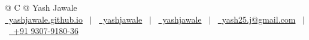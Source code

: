 \documentclass[a4paper,10pt]{article}
\begin{document}
\pagestyle{empty} 



\begin{tabularx}{\linewidth}{@{} C @{}}
\Huge{Yash Jawale} \\[14pt]
\normalsize
\href{https://yashjawale.github.io/}{\raisebox{-0.05\height}\faGlobe \ yashjawale.github.io} \ $|$ \ 
\href{https://github.com/yashjawale}{\raisebox{-0.05\height}\faGithub\ yashjawale} \ $|$ \ 
\href{https://linkedin.com/in/yashjawale}{\raisebox{-0.05\height}\faLinkedin\ yashjawale} \ $|$ \ 
\href{mailto:yash25.j@gmail.com}{\raisebox{-0.05\height}\faEnvelope \ yash25.j@gmail.com} \ $|$ \ 
\href{tel:+919307918036}{\raisebox{-0.05\height}\faMobile \ +91 9307-9180-36} \\[8pt]
\end{tabularx}



\end{document}
